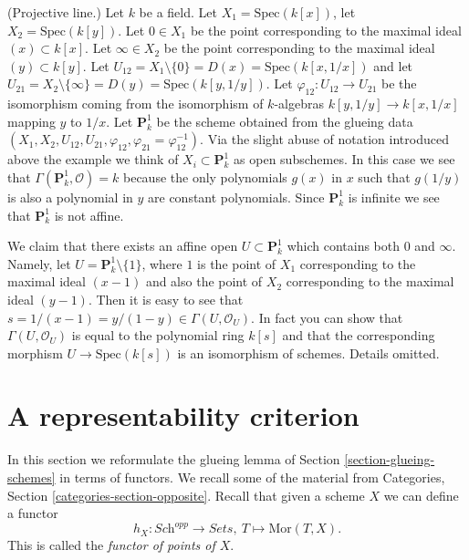 \begin{example}
\label{example-projective-line}
(Projective line.)
Let $k$ be a field.
Let $X_1 = \text{Spec}(k[x])$,
let $X_2 = \text{Spec}(k[y])$.
Let $0 \in X_1$ be the point corresponding to the maximal ideal
$(x) \subset k[x]$.
Let $\infty \in X_2$ be the point corresponding to the maximal ideal
$(y) \subset k[y]$.
Let $U_{12} = X_1 \setminus \{0\} = D(x) = \text{Spec}(k[x, 1/x])$ and
let $U_{21} = X_2 \setminus \{\infty\} = D(y) = \text{Spec}(k[y, 1/y])$.
Let $\varphi_{12} : U_{12} \to U_{21}$ be the isomorphism
coming from the isomorphism of $k$-algebras
$k[y, 1/y] \to k[x, 1/x]$ mapping $y$ to $1/x$.
Let $\mathbf{P}^1_k$ be the scheme obtained from the glueing data
$(X_1, X_2, U_{12}, U_{21}, \varphi_{12},
\varphi_{21} = \varphi_{12}^{-1})$. Via the slight abuse
of notation introduced above the example we think of
$X_i \subset \mathbf{P}^1_k$ as open subschemes. In this case
we see that $\Gamma(\mathbf{P}^1_k, \mathcal{O}) = k$ because the
only polynomials $g(x)$ in $x$ such that $g(1/y)$ is
also a polynomial in $y$ are constant polynomials.
Since $\mathbf{P}^1_k$ is infinite we see that $\mathbf{P}^1_k$ is not affine.

\medskip\noindent
We claim that there exists an affine open $U \subset \mathbf{P}^1_k$
which contains both $0$ and $\infty$. Namely, let
$U = \mathbf{P}^1_k \setminus \{1\}$, where $1$ is the point
of $X_1$ corresponding to the maximal ideal $(x - 1)$
and also the point of $X_2$ corresponding to the
maximal ideal $(y - 1)$. Then it is easy to see that
$s = 1/(x - 1) = y/(1 - y) \in \Gamma(U, \mathcal{O}_U)$.
In fact you can show that $\Gamma(U, \mathcal{O}_U)$
is equal to the polynomial ring $k[s]$ and that the
corresponding morphism $U \to \text{Spec}(k[s])$ is
an isomorphism of schemes. Details omitted.
\end{example}




\section{A representability criterion}
\label{section-representable}

\noindent
In this section we reformulate the glueing lemma
of Section \ref{section-glueing-schemes} in terms
of functors. We recall some of the material from
Categories, Section \ref{categories-section-opposite}.
Recall that given a scheme $X$ we
can define a functor
$$
h_X : \textit{Sch}^{opp}
\longrightarrow
\textit{Sets}, \ 
T \longmapsto \text{Mor}(T, X).
$$
This is called the {\it functor of points of $X$}.

